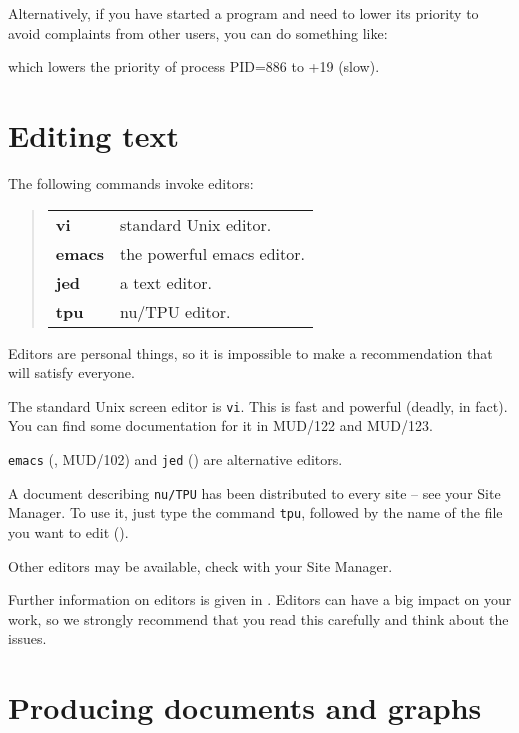 \documentclass[twoside,11pt,nolof]{starlink}
\begin{document}
Alternatively, if you have started a program and need to lower its priority
to avoid complaints from other users, you can do something like:
\begin{terminalv}
\end{terminalv}
which lowers the priority of process PID=886 to +19 (slow).

\newpage

\section{Editing text}

The following commands invoke editors:
\begin{quote}
\begin{tabular}{lp{67mm}}

\textbf{vi}    & standard Unix editor.\\
\textbf{emacs} & the powerful emacs editor.\\
\textbf{jed}   & a text editor.\\
\textbf{tpu}   & nu/TPU editor.

\end{tabular}
\end{quote}
Editors are personal things, so it is impossible to make a recommendation
that will satisfy everyone.

The standard Unix screen editor is \texttt{vi}.
This is fast and powerful (deadly, in fact).
You can find some documentation for it in MUD/122 and MUD/123.

\texttt{emacs}
(, MUD/102) and \texttt{jed}
() are alternative editors.

A document describing \texttt{nu/TPU} has been distributed to every site --
see your Site Manager. To use it, just type the command \texttt{tpu},
followed by the name of the file you want to edit
().

Other editors may be available, check with your Site Manager.

Further information on editors is given in
.
Editors can have a big impact on your work, so we strongly recommend that you
read this carefully and think about the issues.

\newpage

\section{Producing documents and graphs}
\end{document}
